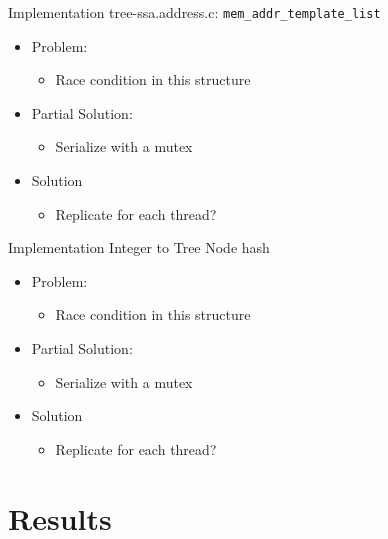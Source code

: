 \begin{frame}{Implementation}
    tree-ssa.address.c: \texttt{mem\_addr\_template\_list} 

    \begin{itemize}
        \item Problem:
            \begin{itemize}
                \item Race condition in this structure
            \end{itemize}
        \item Partial Solution:
            \begin{itemize}
                \item Serialize with a mutex
            \end{itemize}
        \item Solution 
            \begin{itemize}
                \item Replicate for each thread?
            \end{itemize}
    \end{itemize}

\end{frame}

\begin{frame}{Implementation}
    Integer to Tree Node hash

    \begin{itemize}
        \item Problem:
            \begin{itemize}
                \item Race condition in this structure
            \end{itemize}
        \item Partial Solution:
            \begin{itemize}
                \item Serialize with a mutex
            \end{itemize}
        \item Solution 
            \begin{itemize}
                \item Replicate for each thread?
            \end{itemize}
    \end{itemize}
\end{frame}


\section{Results}

